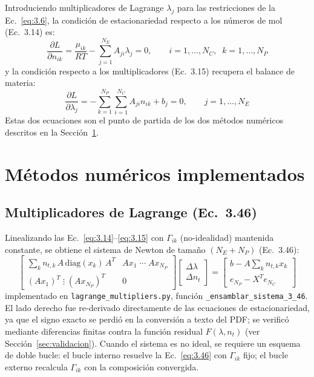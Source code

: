 \documentclass[11pt,a4paper]{article}
\begin{document}
Introduciendo multiplicadores de Lagrange $\lambda_j$ para las
restricciones de la Ec.~\eqref{eq:3.6}, la condición de estacionariedad
respecto a los números de mol (Ec.~3.14) es:
\begin{equation}
  \frac{\partial L}{\partial n_{ik}} = \frac{\mu_{ik}}{RT} - \sum_{j=1}^{N_E} A_{ji}\lambda_j = 0,
  \qquad i=1,\dots,N_C,\;\; k=1,\dots,N_P
  \label{eq:3.14}
\end{equation}
y la condición respecto a los multiplicadores (Ec.~3.15) recupera el
balance de materia:
\begin{equation}
  \frac{\partial L}{\partial \lambda_j} = -\sum_{k=1}^{N_P}\sum_{i=1}^{N_C} A_{ji} n_{ik} + b_j = 0,
  \qquad j = 1,\dots,N_E
  \label{eq:3.15}
\end{equation}
Estas dos ecuaciones son el punto de partida de los dos métodos
numéricos descritos en la Sección~\ref{sec:metodos}.

\section{Métodos numéricos implementados}
\label{sec:metodos}

\subsection{Multiplicadores de Lagrange (Ec.~3.46)}
\label{sec:lagrange}

Linealizando las Ec.~\eqref{eq:3.14}--\eqref{eq:3.15} con $\Gamma_{ik}$
(no-idealidad) mantenida constante, se obtiene el sistema de Newton de
tamaño $(N_E+N_P)$ (Ec.~3.46):
\begin{equation}
  \begin{bmatrix}
    \sum_k n_{t,k}\, A\,\mathrm{diag}(x_k)\, A^T & A x_1 \;\cdots\; A x_{N_P} \\[2pt]
    (A x_1)^T \;\vdots\; (A x_{N_P})^T & 0
  \end{bmatrix}
  \begin{bmatrix}\Delta\lambda \\ \Delta n_t\end{bmatrix}
  =
  \begin{bmatrix} b - A\sum_k n_{t,k}x_k \\ e_{N_P} - X^T e_{N_C}\end{bmatrix}
  \label{eq:3.46}
\end{equation}
implementado en \texttt{lagrange\_multipliers.py}, función
\texttt{\_ensamblar\_sistema\_3\_46}. El lado derecho fue re-derivado
directamente de las ecuaciones de estacionariedad, ya que el signo
exacto se perdió en la conversión a texto del PDF; se verificó
mediante diferencias finitas contra la función residual $F(\lambda,
n_t)$ (ver Sección~\ref{sec:validacion}). Cuando el sistema es no
ideal, se requiere un esquema de doble bucle: el bucle interno resuelve
la Ec.~\eqref{eq:3.46} con $\Gamma_{ik}$ fijo; el bucle externo
recalcula $\Gamma_{ik}$ con la composición convergida.
\end{document}
